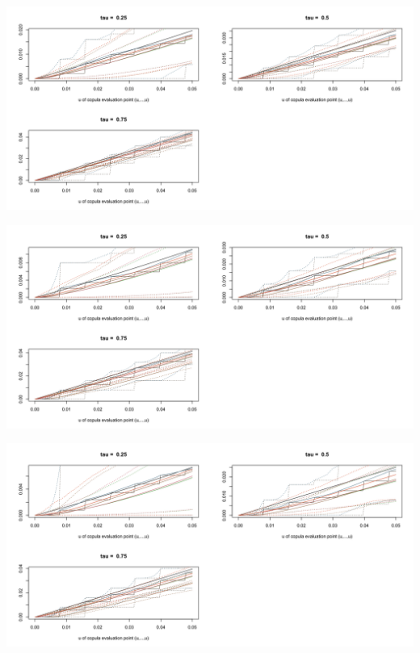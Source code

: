 \documentclass[12pt]{report}
\newcommand{\1}{\mathbf{1}}
\begin{document}
\begin{flushleft}
\begin{center}
\label{C_2d_c}
\includegraphics[width=17cm]{CumulativeProb/C_2d_c.png}
\end{center}%

\begin{center}
\label{C_3d_c}
\includegraphics[width=17cm]{CumulativeProb/C_3d_c.png}
\end{center}%

\begin{center}
\label{C_4d_c}
\includegraphics[width=17cm]{CumulativeProb/C_4d_c.png}
\end{center}%


\end{flushleft}
\end{document}
